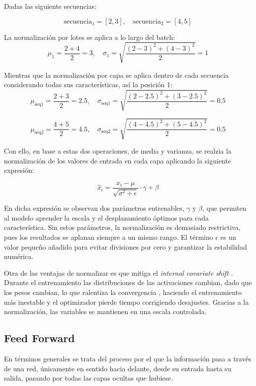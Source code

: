 \documentclass[11pt]{book}
\begin{document}
Dadas las siguiente secuencias: 

\[
\text{secuencia}_1 = [2,3], \quad \text{secuencia}_2 = [4,5]
\]

La normalización por lotes se aplica a lo largo del batch:
\[
\mu_1 = \frac{2 + 4}{2} = 3, 
\quad 
\sigma_1 = \sqrt{\frac{(2-3)^2 + (4-3)^2}{2}} = 1
\]

Mientras que la normalización por capa se aplica dentro de cada secuencia considerando todas sus características, así la posición 1:
\[
\mu_{\text{seq1}} = \frac{2 + 3}{2} = 2.5, 
\quad 
\sigma_{\text{seq1}} = \sqrt{\frac{(2-2.5)^2 + (3-2.5)^2}{2}} = 0.5
\]

\[
\mu_{\text{seq2}} = \frac{4 + 5}{2} = 4.5, 
\quad 
\sigma_{\text{seq2}} = \sqrt{\frac{(4-4.5)^2 + (5-4.5)^2}{2}} = 0.5
\]


Con ello, en base a estas dos operaciones, de media y varianza, se realzia la normalización de los valores de entrada en cada capa aplicando la siguiente expresión: 

\begin{equation}
    \hat{x}_i = \frac{x_i - \mu}{\sqrt{\sigma^2 + \epsilon}} \cdot \gamma + \beta
    \label{eq:normalization_sigma}
\end{equation}


En dicha expresión se observan dos parámetros entrenables, $\gamma$ y $\beta$, que permiten al modelo aprender la escala y el desplazamiento óptimos para cada característica. Sin estos parámetros, la normalización es demasiado restrictiva, pues los resultados se aplanan siempre a un mismo rango. El término $\epsilon$ es un valor pequeño añadido para evitar divisiones por cero y garantizar la estabilidad numérica.

Otra de las ventajas de normalizar es que mitiga el \textit{internal covariate shift} \parencite{sharma2024addnorm}. Durante el entrenamiento las distribuciones de las activaciones cambian, dado que los pesos cambian, lo que ralentiza la convergencia \parencite{apxml_addnorm}, haciendo el entrenamiento más inestable y el optimizador pierde tiempo corrigiendo desajustes. Gracias a la normalización, las variables se mantienen en una escala controlada.


\subsection{Feed Forward} \label{subsec:feedforward}
En términos generales se trata del proceso por el que la información pasa a través de una red, únicamente en sentido hacia delante, desde su entrada hasta su salida, pasando por todas las capas ocultas que hubiese. 
\end{document}
